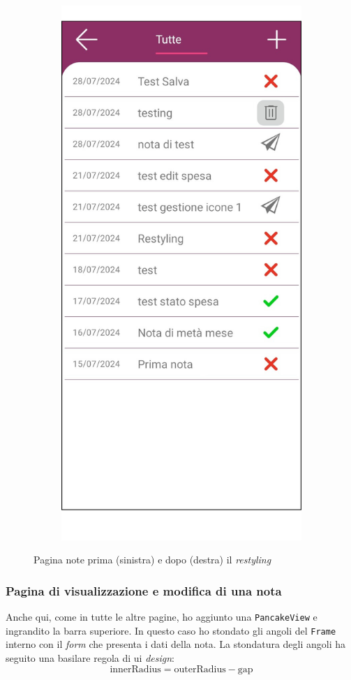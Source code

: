 \begin{figure}[H]
\begin{subfigure}{.5\textwidth}
        \includegraphics[width=.7\columnwidth]{images/screenshot/new/allNote.png}\vspace{2mm}
    \end{subfigure}
    \caption{Pagina note prima (sinistra) e dopo (destra) il \textit{restyling}}
\end{figure}


\subsubsection{Pagina di visualizzazione e modifica di una nota}

Anche qui, come in tutte le altre pagine, ho aggiunto una \texttt{PancakeView} e ingrandito la barra superiore. In questo caso ho stondato gli angoli del \texttt{Frame} interno con il \textit{form} che presenta i dati della nota. La stondatura degli angoli ha seguito una basilare regola di \acrshort{ui} \textit{design}:
\begin{equation*}
    \text{innerRadius} = \text{outerRadius}-\text{gap}
\end{equation*}

